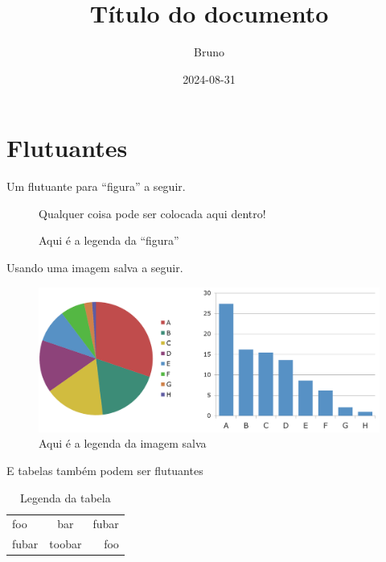 \documentclass[dsc,male,12pt,a4paper]{ita}
\title{Título do documento}
\author{Bruno}
\date{2024-08-31}
\begin{document}
\frontmatter
\maketitle

\listoffigures
\listoftables

\tableofcontents

\mainmatter
\chapter{Flutuantes}

\lipsum[3-5]
Um flutuante para ``figura'' a seguir.\par
\begin{figure}[tbp]
	Qualquer coisa pode ser colocada aqui dentro!\\
	\lipsum[1]
	\caption{Aqui é a legenda da ``figura''}
\end{figure}\par
\lipsum[6-7]

Usando uma imagem salva a seguir.\par
\begin{figure}[tbp]
	\centering
	\includegraphics[width=\textwidth]{./imagem.png}
	\caption{Aqui é a legenda da imagem salva}\par
\end{figure}

E tabelas também podem ser flutuantes
\begin{table}
	\centering
	\begin{tabular}{|l|c|r|}
		\hline
		foo   & bar    & fubar \\
		fubar & toobar & foo   \\
		\hline
	\end{tabular}
	\caption{Legenda da tabela}
\end{table}
\end{document}
